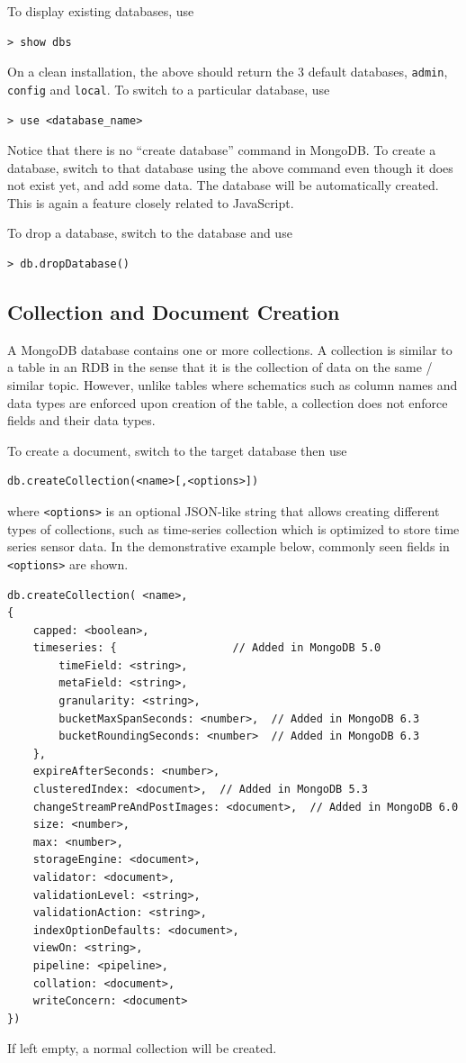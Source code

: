 To display existing databases, use
\begin{lstlisting}
> show dbs
\end{lstlisting}
On a clean installation, the above should return the 3 default databases, \verb|admin|, \verb|config| and \verb|local|. To switch to a particular database, use
\begin{lstlisting}
> use <database_name>
\end{lstlisting}
Notice that there is no ``create database'' command in MongoDB. To create a database, switch to that database using the above command even though it does not exist yet, and add some data. The database will be automatically created. This is again a feature closely related to JavaScript.

To drop a database, switch to the database and use 
\begin{lstlisting}
> db.dropDatabase()
\end{lstlisting}

\subsection{Collection and Document Creation}

A MongoDB database contains one or more collections. A collection is similar to a table in an RDB in the sense that it is the collection of data on the same / similar topic. However, unlike tables where schematics such as column names and data types are enforced upon creation of the table, a collection does not enforce fields and their data types. 

To create a document, switch to the target database then use
\begin{lstlisting}
db.createCollection(<name>[,<options>])
\end{lstlisting}
where \verb|<options>| is an optional JSON-like string that allows creating different types of collections, such as time-series collection which is optimized to store time series sensor data. In the demonstrative example below, commonly seen fields in \verb|<options>| are shown.
\begin{lstlisting}
db.createCollection( <name>,
{
	capped: <boolean>,
	timeseries: {                  // Added in MongoDB 5.0
		timeField: <string>,
		metaField: <string>,
		granularity: <string>,
		bucketMaxSpanSeconds: <number>,  // Added in MongoDB 6.3
		bucketRoundingSeconds: <number>  // Added in MongoDB 6.3
	},
	expireAfterSeconds: <number>,
	clusteredIndex: <document>,  // Added in MongoDB 5.3
	changeStreamPreAndPostImages: <document>,  // Added in MongoDB 6.0
	size: <number>,
	max: <number>,
	storageEngine: <document>,
	validator: <document>,
	validationLevel: <string>,
	validationAction: <string>,
	indexOptionDefaults: <document>,
	viewOn: <string>,
	pipeline: <pipeline>,
	collation: <document>,
	writeConcern: <document>
})
\end{lstlisting}
If left empty, a normal collection will be created.

